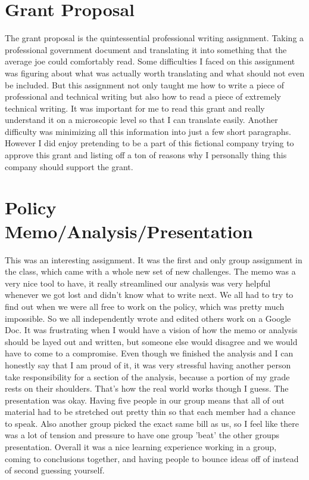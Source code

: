 \documentclass[12pt,letterpaper]{article}
\begin{document}
\newpage
\section{Grant Proposal}
The grant proposal is the quintessential professional writing assignment. Taking a professional government document and translating it into something that the average joe could comfortably read. Some difficulties I faced on this assignment was figuring about what was actually worth translating and what should not even be included. But this assignment not only taught me how to write a piece of professional and technical writing but also how to read a piece of extremely technical writing. It was important for me to read this grant and really understand it on a microscopic level so that I can translate easily. Another difficulty was minimizing all this information into just a few short paragraphs. However I did enjoy pretending to be a part of this fictional company trying to approve this grant and listing off a ton of reasons why I personally thing this company should support the grant. 

\newpage
\section{Policy Memo/Analysis/Presentation}
This was an interesting assignment. It was the first and only group assignment in the class, which came with a whole new set of new challenges. The memo was a very nice tool to have, it really streamlined our analysis was very helpful whenever we got lost and didn't know what to write next. We all had to try to find out when we were all free to work on the policy, which was pretty much impossible. So we all independently wrote and edited others work on a Google Doc. It was frustrating when I would have a vision of how the memo or analysis should be layed out and written, but someone else would disagree and we would have to come to a compromise. Even though we finished the analysis and I can honestly say that I am proud of it, it was very stressful having another person take responsibility for a section of the analysis, because a portion of my grade rests on their shoulders. That's how the real world works though I guess. The presentation was okay. Having five people in our group means that all of out material had to be stretched out pretty thin so that each member had a chance to speak. Also another group picked the exact same bill as us, so I feel like there was a lot of tension and pressure to have one group 'beat' the other groups presentation. Overall it was a nice learning experience working in a group, coming to conclusions together, and having people to bounce ideas off of instead of second guessing yourself.
\end{document}
